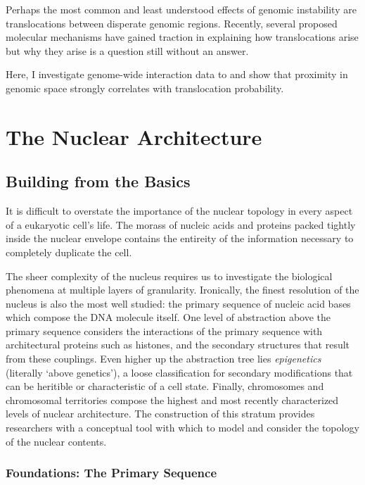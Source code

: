 \documentclass[phd,tocprelim]{cornell}
\begin{document}
Perhaps the most common and least understood effects of genomic instability are
translocations between disperate genomic regions.  Recently, several proposed
molecular mechanisms have gained traction in explaining how translocations arise
but why they arise is a question still without an answer.

Here, I investigate genome-wide interaction data to and show that proximity in
genomic space strongly correlates with translocation probability.






\chapter{The Nuclear Architecture}

\section{Building from the Basics}

It is difficult to overstate the importance of the nuclear topology in
every aspect of a eukaryotic cell's life.  The morass of nucleic acids and
proteins packed tightly inside the nuclear envelope contains the entireity of
the information necessary to completely duplicate the cell.

The sheer complexity of the nucleus requires us to investigate the biological
phenomena at multiple layers of granularity.  Ironically, the finest resolution
of the nucleus is also the most well studied: the primary sequence of nucleic
acid bases which compose the DNA molecule itself.  One level of abstraction
above the primary sequence considers the interactions of the primary sequence
with architectural proteins such as histones, and the secondary structures that
result from these couplings.  Even higher up the abstraction tree lies
\textit{epigenetics} (literally `above genetics'\cite{dictepi2014}), a loose
classification for secondary modifications that can be heritible or characteristic
of a cell state.  Finally, chromosomes and chromosomal territories compose the
highest and most recently characterized levels of nuclear architecture.  The
construction of this stratum provides researchers with a conceptual tool with
which to model and consider the topology of the nuclear contents.

\subsection{Foundations: The  Primary Sequence}
\end{document}
